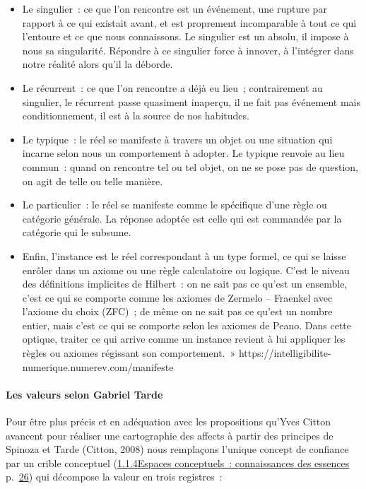 \documentclass[
  letterpaper,
  DIV=11,
  numbers=noendperiod]{scrreprt}
\let\oldparagraph\paragraph
\renewcommand{\paragraph}[1]{\oldparagraph{#1}\mbox{}}
\providecommand{\tightlist}{%
  \setlength{\itemsep}{0pt}\setlength{\parskip}{0pt}}\usepackage{longtable,booktabs,array}
\begin{document}
\begin{itemize}
\tightlist
\item
  Le singulier~: ce que l'on rencontre est un événement, une rupture par
  rapport à ce qui existait avant, et est proprement incomparable à tout
  ce qui l'entoure et ce que nous connaissons. Le singulier est un
  absolu, il impose à nous sa singularité. Répondre à ce singulier force
  à innover, à l'intégrer dans notre réalité alors qu'il la déborde.~
\item
  Le récurrent~: ce que l'on rencontre a déjà eu lieu~; contrairement au
  singulier, le récurrent passe quasiment inaperçu, il ne fait pas
  événement mais conditionnement, il est à la source de nos habitudes.
\item
  Le typique~: le réel se manifeste à travers un objet ou une situation
  qui incarne selon nous un comportement à adopter. Le typique renvoie
  au lieu commun~: quand on rencontre tel ou tel objet, on ne se pose
  pas de question, on agit de telle ou telle manière.
\item
  Le particulier~: le réel se manifeste comme le spécifique d'une règle
  ou catégorie générale. La réponse adoptée est celle qui est commandée
  par la catégorie qui le subsume.
\item
  Enfin, l'instance est le réel correspondant à un type formel, ce qui
  se laisse enrôler dans un axiome ou une règle calculatoire ou logique.
  C'est le niveau des définitions implicites de Hilbert~: on ne sait pas
  ce qu'est un ensemble, c'est ce qui se comporte comme les axiomes de
  Zermelo -- Fraenkel avec l'axiome du choix (ZFC)~; de même on ne sait
  pas ce qu'est un nombre entier, mais c'est ce qui se comporte selon
  les axiomes de Peano. Dans cette optique, traiter ce qui arrive comme
  un instance revient à lui appliquer les règles ou axiomes régissant
  son comportement.~»
  https://intelligibilite-numerique.numerev.com/manifeste
\end{itemize}

\hypertarget{les-valeurs-selon-gabriel-tarde}{%
\paragraph{Les valeurs selon Gabriel
Tarde}\label{les-valeurs-selon-gabriel-tarde}}

Pour être plus précis et en adéquation avec les propositions qu'Yves
Citton avancent pour réaliser une cartographie des affects à partir des
principes de Spinoza et Tarde (Citton, 2008) nous remplaçons l'unique
concept de confiance par un crible conceptuel
(\protect\hyperlink{anchor-13}{1.1.4Espaces conceptuels~: connaissances
des essences} p.~\protect\hyperlink{anchor-13}{26}) qui décompose la
valeur en trois registres~:
\end{document}
